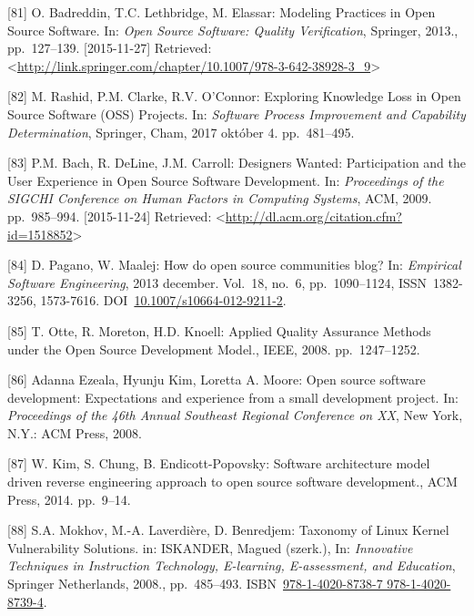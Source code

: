 \documentclass[12pt,magyar,a4paper,oneside]{scrreprt}
\begin{document}
\leavevmode\hypertarget{ref-badreddin_modeling_2013}{}%
{[}81{]} O. Badreddin, T.C. Lethbridge, M. Elassar: Modeling Practices
in Open Source Software. In: \emph{Open Source Software: Quality
Verification}, Springer, 2013., pp.~127--139. {[}2015-11-27{]}
Retrieved:
\textless{}\url{http://link.springer.com/chapter/10.1007/978-3-642-38928-3_9}\textgreater{}

\leavevmode\hypertarget{ref-rashid_exploring_2017}{}%
{[}82{]} M. Rashid, P.M. Clarke, R.V. O'Connor: Exploring Knowledge Loss
in Open Source Software (OSS) Projects. In: \emph{Software Process
Improvement and Capability Determination}, Springer, Cham, 2017 október
4. pp.~481--495.

\leavevmode\hypertarget{ref-bach_designers_2009}{}%
{[}83{]} P.M. Bach, R. DeLine, J.M. Carroll: Designers Wanted:
Participation and the User Experience in Open Source Software
Development. In: \emph{Proceedings of the SIGCHI Conference on Human
Factors in Computing Systems}, ACM, 2009. pp.~985--994. {[}2015-11-24{]}
Retrieved:
\textless{}\url{http://dl.acm.org/citation.cfm?id=1518852}\textgreater{}

\leavevmode\hypertarget{ref-pagano_how_2013}{}%
{[}84{]} D. Pagano, W. Maalej: How do open source communities blog? In:
\emph{Empirical Software Engineering}, 2013 december. Vol.~18, no.~6,
pp.~1090--1124, ISSN~1382-3256, 1573-7616.
DOI~\href{https://doi.org/10.1007/s10664-012-9211-2}{10.1007/s10664-012-9211-2}.

\leavevmode\hypertarget{ref-otte_applied_2008}{}%
{[}85{]} T. Otte, R. Moreton, H.D. Knoell: Applied Quality Assurance
Methods under the Open Source Development Model., IEEE, 2008.
pp.~1247--1252.

\leavevmode\hypertarget{ref-adanna_ezeala_open_2008}{}%
{[}86{]} Adanna Ezeala, Hyunju Kim, Loretta A. Moore: Open source
software development: Expectations and experience from a small
development project. In: \emph{Proceedings of the 46th Annual Southeast
Regional Conference on XX}, New York, N.Y.: ACM Press, 2008.

\leavevmode\hypertarget{ref-kim_software_2014}{}%
{[}87{]} W. Kim, S. Chung, B. Endicott-Popovsky: Software architecture
model driven reverse engineering approach to open source software
development., ACM Press, 2014. pp.~9--14.

\leavevmode\hypertarget{ref-mokhov_taxonomy_2008}{}%
{[}88{]} S.A. Mokhov, M.-A. Laverdière, D. Benredjem: Taxonomy of Linux
Kernel Vulnerability Solutions. in: ISKANDER, Magued (szerk.), In:
\emph{Innovative Techniques in Instruction Technology, E-learning,
E-assessment, and Education}, Springer Netherlands, 2008., pp.~485--493.
ISBN~\href{https://worldcat.org/isbn/978-1-4020-8738-7\%20978-1-4020-8739-4}{978-1-4020-8738-7 978-1-4020-8739-4}.
\end{document}
